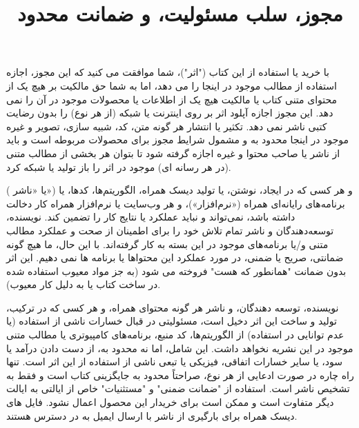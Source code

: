 \title{
    \Huge
    \BTitr
    \begin{center}
        \textbf{مجوز، سلب مسئولیت، و ضمانت محدود}
    \end{center}
}
\textbf{\vspace{20pt}}

{\Large
با خرید یا استفاده از این کتاب ("اثر")، شما موافقت می کنید که این مجوز، اجازه استفاده از مطالب موجود در اینجا را می دهد، اما به شما حق مالکیت بر هیچ یک از محتوای متنی کتاب یا مالکیت هیچ یک از اطلاعات یا محصولات موجود در آن را نمی دهد.
این مجوز اجازه آپلود اثر بر روی اینترنت یا شبکه (از هر نوع) را بدون رضایت کتبی ناشر نمی دهد.
تکثیر یا انتشار هر گونه متن، کد، شبیه سازی، تصویر و غیره موجود در اینجا محدود به و مشمول شرایط مجوز برای محصولات مربوطه است و باید از ناشر یا صاحب محتوا و غیره اجازه گرفته شود تا بتوان هر بخشی از مطالب متنی (در هر رسانه ای) موجود در اثر را باز تولید یا شبکه کرد.
}

{\Large
{} ( یا «ناشر») و هر کسی که در ایجاد، نوشتن، یا تولید دیسک همراه، الگوریتم‌ها، کدها، یا برنامه‌های رایانه‌ای همراه («نرم‌افزار»)، و هر وب‌سایت یا نرم‌افزار همراه کار دخالت داشته باشد، نمی‌تواند و نباید عملکرد یا نتایج کار را تضمین کند.
نویسنده، توسعه‌دهندگان و ناشر تمام تلاش خود را برای اطمینان از صحت و عملکرد مطالب متنی و/یا برنامه‌های موجود در این بسته به کار گرفته‌اند.
با این حال، ما هیچ گونه ضمانتی، صریح یا ضمنی، در مورد عملکرد این محتواها یا برنامه ها نمی دهیم.
این اثر بدون ضمانت "همانطور که هست" فروخته می شود (به جز مواد معیوب استفاده شده در ساخت کتاب یا به دلیل کار معیوب).
}

{\Large
نویسنده، توسعه دهندگان، و ناشر هر گونه محتوای همراه، و هر کسی که در ترکیب، تولید و ساخت این اثر دخیل است، مسئولیتی در قبال خسارات ناشی از استفاده (یا عدم توانایی در استفاده) از الگوریتم‌ها، کد منبع، برنامه‌های کامپیوتری یا مطالب متنی موجود در این نشریه نخواهد داشت.
این شامل، اما نه محدود به، از دست دادن درآمد یا سود، یا سایر خسارات اتفاقی، فیزیکی یا تبعی ناشی از استفاده از این اثر است.
تنها راه چاره در صورت ادعایی از هر نوع، صراحتاً محدود به جایگزینی کتاب است و فقط به تشخیص ناشر است.
استفاده از "ضمانت ضمنی" و "مستثنیات" خاص از ایالتی به ایالت دیگر متفاوت است و ممکن است برای خریدار این محصول اعمال نشود.
فایل های دیسک همراه برای بارگیری از ناشر با ارسال ایمیل به  در دسترس هستند.
}


